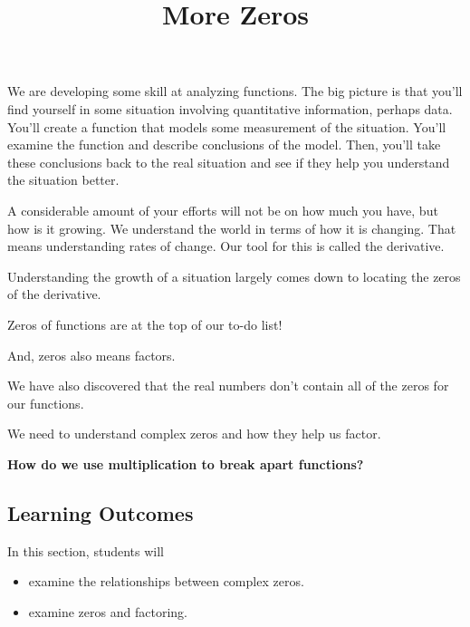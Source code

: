 \documentclass{ximera}
\title{More Zeros}
\begin{document}
\begin{abstract}
%
\end{abstract}
\maketitle




We are developing some skill at analyzing functions.  The big picture is that you'll find yourself in some situation involving quantitative information, perhaps data.  You'll create a function that models some measurement of the situation.  You'll examine the function and describe conclusions of the model.  Then, you'll take these conclusions back to the real situation and see if they help you understand the situation better.




A considerable amount of your efforts will not be on how much you have, but how is it growing.  We understand the world in terms of how it is changing.  That means understanding rates of change.  Our tool for this is called the derivative.




Understanding the growth of a situation largely comes down to locating the zeros of the derivative.


Zeros of functions are at the top of our to-do list!  

And, zeros also means factors.  


We have also discovered that the real numbers don't contain all of the zeros for our functions.  


We need to understand complex zeros and how they help us factor.  


\begin{center}
\textbf{\textcolor{red!80!black}{How do we use multiplication to break apart functions?}}
\end{center} 





















\subsection{Learning Outcomes}


\begin{sectionOutcomes}
In this section, students will 

\begin{itemize}
\item examine the relationships between complex zeros.
\item examine zeros and factoring.
\end{itemize}
\end{sectionOutcomes}
\end{document}
